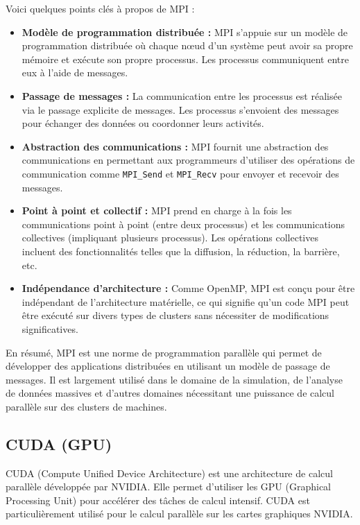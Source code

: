 \documentclass[10pt,a4paper]{article}
\begin{document}
Voici quelques points clés à propos de MPI :

\begin{itemize}
    
    \item \textbf{Modèle de programmation distribuée :} MPI s'appuie sur un modèle de programmation distribuée où chaque nœud d'un système peut avoir sa propre mémoire et exécute son propre processus. Les processus communiquent entre eux à l'aide de messages.
    
    \item \textbf{Passage de messages :} La communication entre les processus est réalisée via le passage explicite de messages. Les processus s'envoient des messages pour échanger des données ou coordonner leurs activités.
    
    \item \textbf{Abstraction des communications :} MPI fournit une abstraction des communications en permettant aux programmeurs d'utiliser des opérations de communication comme \verb|MPI_Send| et \verb|MPI_Recv| pour envoyer et recevoir des messages.
    
    \item \textbf{Point à point et collectif :} MPI prend en charge à la fois les communications point à point (entre deux processus) et les communications collectives (impliquant plusieurs processus). Les opérations collectives incluent des fonctionnalités telles que la diffusion, la réduction, la barrière, etc.
    
    \item \textbf{Indépendance d'architecture :} Comme OpenMP, MPI est conçu pour être indépendant de l'architecture matérielle, ce qui signifie qu'un code MPI peut être exécuté sur divers types de clusters sans nécessiter de modifications significatives.
\end{itemize}


En résumé, MPI est une norme de programmation parallèle qui permet de développer des applications distribuées en utilisant un modèle de passage de messages. Il est largement utilisé dans le domaine de la simulation, de l'analyse de données massives et d'autres domaines nécessitant une puissance de calcul parallèle sur des clusters de machines.


\subsection{CUDA (GPU)}

CUDA (Compute Unified Device Architecture) est une architecture de calcul parallèle développée par NVIDIA. Elle permet d'utiliser les GPU (Graphical Processing Unit) pour accélérer des tâches de calcul intensif. CUDA est particulièrement utilisé pour le calcul parallèle sur les cartes graphiques NVIDIA.
\end{document}
